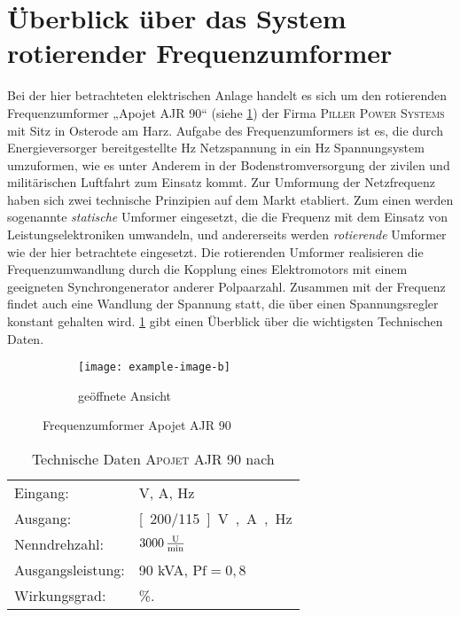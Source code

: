 \section{Überblick über das System rotierender Frequenzumformer}
\label{sec:Uberblick}
Bei der hier betrachteten elektrischen Anlage handelt es sich um den rotierenden Frequenzumformer „Apojet AJR 90“ (siehe \cref{fig:RenderbildUmformer}) der Firma \textsc{Piller Power Systems} mit Sitz in Osterode am Harz. Aufgabe des Frequenzumformers ist es, die durch Energieversorger bereitgestellte \unit[50]{Hz} Netzspannung in ein \unit[400]{Hz} Spannungsystem umzuformen, wie es unter Anderem in der Bodenstromversorgung der zivilen und militärischen Luftfahrt zum Einsatz kommt.
Zur Umformung der Netzfrequenz haben sich zwei technische Prinzipien auf dem Markt etabliert. Zum einen werden sogenannte \emph{statische} Umformer eingesetzt, die die Frequenz mit dem Einsatz von Leistungselektroniken umwandeln, und andererseits werden \emph{rotierende} Umformer wie der hier betrachtete eingesetzt. Die rotierenden Umformer realisieren die Frequenzumwandlung durch die Kopplung eines Elektromotors mit einem geeigneten Synchrongenerator anderer Polpaarzahl. Zusammen mit der Frequenz findet auch eine Wandlung der Spannung statt, die über einen Spannungsregler konstant gehalten wird. \cref{tab:Leistungsdaten} gibt einen Überblick über die wichtigsten Technischen Daten.

\begin{figure}
\centering
\begin{subfigure}{\textwidth}
	\centering
	\texttt{[image: example-image-b]}
	\caption{geöffnete Ansicht}
\end{subfigure}
\caption{Frequenzumformer Apojet AJR 90}
\label{fig:RenderbildUmformer}
\end{figure}

\begin{table}[b]
\caption{Technische Daten \textsc{Apojet AJR 90} nach \cite{pillerpowersystemsBetriebshandbuchAPOJET202021}}\label{tab:Leistungsdaten}
\centering
\begin{tabular}{@{}ll@{}}
\toprule
Eingang:         & \unit[400]{V}, \unit[145]{A}, \unit[50]{Hz}      \\ 
Ausgang:         & \unit[200/115]{V}, \unit[260]{A}, \unit[400]{Hz} \\
Nenndrehzahl:    & $\unit[3000]{\frac{U}{min}}$                     \\
Ausgangsleistung:& 90 kVA, $\mathrm{Pf}=0,8$                        \\
Wirkungsgrad:    & \unit[85]{\%}.                                   \\ \bottomrule
\end{tabular}
\end{table}


